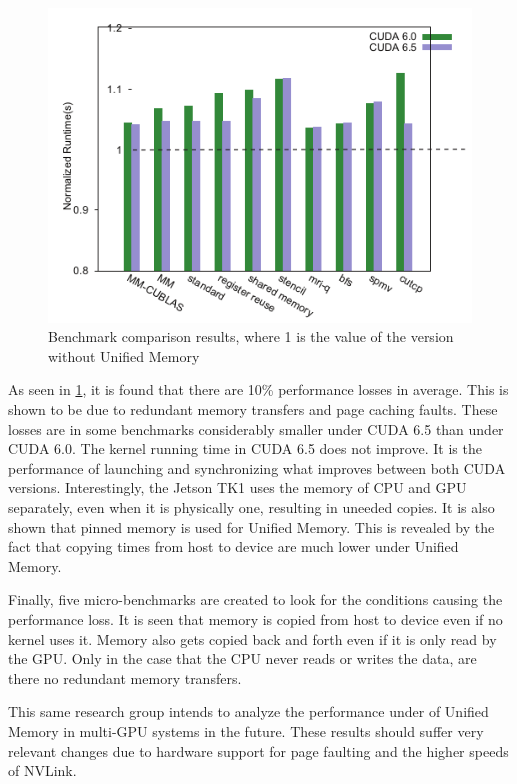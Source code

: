 \begin{figure}[ht!]
    \centering
    \includegraphics[width=\linewidth]{unified_memory_benchmark_results}
    \caption{Benchmark comparison results, where 1 is the value of the version without Unified Memory \cite{li2015evaluation}}
    \label{fig:umem}
\end{figure}

As seen in \ref{fig:umem}, it is found that there are 10\% performance losses in average.
This is shown to be due to redundant memory transfers and page caching faults.
These losses are in some benchmarks considerably smaller under CUDA 6.5 than under CUDA 6.0.
The kernel running time in CUDA 6.5 does not improve.
It is the performance of launching and synchronizing what improves between both CUDA versions.
Interestingly, the Jetson TK1 uses the memory of CPU and GPU separately, even when it is physically one, resulting in uneeded copies.
It is also shown that pinned memory is used for Unified Memory.
This is revealed by the fact that copying times from host to device are much lower under Unified Memory.

Finally, five micro-benchmarks are created to look for the conditions causing the performance loss.
It is seen that memory is copied from host to device even if no kernel uses it.
Memory also gets copied back and forth even if it is only read by the GPU.
Only in the case that the CPU never reads or writes the data, are there no redundant memory transfers.

This same research group intends to analyze the performance under of Unified Memory in multi-GPU systems in the future.
These results should suffer very relevant changes due to hardware support for page faulting and the higher speeds of NVLink.

